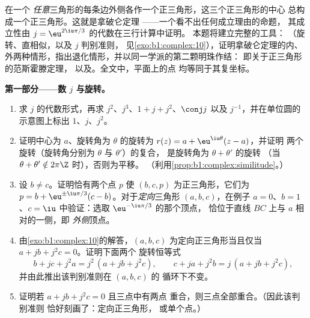 \begin{problem}\label{pb:b1:complex:1}
在一个
\emph{任意}三角形的每条边外侧各作一个正三角形，这三个正三角形的中心
总构成一个正三角形。这就是拿破仑定理
——一个看不出任何成立理由的命题，
其成立性由 $j = \eu^{2\iu\pi/3}$ 的代数在三行计算中证明。
本题将建立完整的工具：
（旋转、直相似，以及 $j$ 判别准则，
见\cref{exo:b1:complex:10}），证明拿破仑定理的内、
外两种情形，指出退化情形，并以同一学派的第二颗明珠作结：
即关于正三角形的范斯霍滕定理，
以及。全文中，平面上的点
均等同于其复坐标。

\medskip
\noindent\textbf{第一部分——数 $j$ 与旋转。}
\begin{enumerate}
  \item 求 $j$ 的代数形式，再求 $j^2$、$j^3$、$1 + j
        + j^2$、$\conj j$ 以及 $j^{-1}$，并在单位圆的
        示意图上标出 $1$、$j$、$j^2$。
  \item 证明中心为 $a$、旋转角为 $\theta$ 的旋转为
        $r(z) = a + \eu^{\iu\theta}(z - a)$，并证明
        两个旋转（旋转角分别为 $\theta$ 与 $\theta'$）的复合，
        是旋转角为 $\theta + \theta'$ 的旋转
        （当 $\theta + \theta' \notin 2\pi\Z$ 时），否则为平移。
        （利用\cref{prop:b1:complex:similitude}。）
  \item 设 $b \neq c$。证明恰有两个点 $p$
        使 $(b, c, p)$ 为正三角形，它们为 $p = b +
        \eu^{\pm\iu\pi/3}(c - b)$。对于\emph{定向}三角形
        $(a, b, c)$，在例子 $a = 0$、$b = 1$、$c =
        \iu$ 中验证：选取 $\eu^{-\iu\pi/3}$ 的那个顶点，
        恰位于直线 $BC$ 上与 $a$ 相对的一侧，即
        \emph{外侧}顶点。
  \item 由\cref{exo:b1:complex:10}的解答，$(a, b, c)$
        为定向正三角形当且仅当 $a + jb + j^2c = 0$。证明下面两个
        旋转恒等式
        \[
        b + jc + j^2a = j^2\,(a + jb + j^2c),
        \qquad
        c + ja + j^2b = j\,(a + jb + j^2c),
        \]
        并由此推出该判别准则在 $(a, b, c)$ 的
        循环下不变。
  \item 证明若 $a + jb + j^2c = 0$ 且三点中有两点
        重合，则三点全部重合。（因此该判别准则
        恰好刻画了：定向正三角形，
        或单个点。）
\end{enumerate}


\end{problem}

